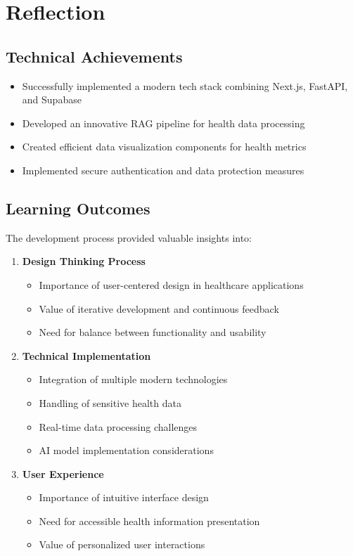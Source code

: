 \section{Reflection}
\subsection{Technical Achievements}

\begin{itemize}
    \item Successfully implemented a modern tech stack combining Next.js, FastAPI, and Supabase
    \item Developed an innovative RAG pipeline for health data processing
    \item Created efficient data visualization components for health metrics
    \item Implemented secure authentication and data protection measures
\end{itemize}

\subsection{Learning Outcomes}

The development process provided valuable insights into:

\begin{enumerate}
    \item \textbf{Design Thinking Process}
    \begin{itemize}
        \item Importance of user-centered design in healthcare applications
        \item Value of iterative development and continuous feedback
        \item Need for balance between functionality and usability
    \end{itemize}

    \item \textbf{Technical Implementation}
    \begin{itemize}
        \item Integration of multiple modern technologies
        \item Handling of sensitive health data
        \item Real-time data processing challenges
        \item AI model implementation considerations
    \end{itemize}

    \item \textbf{User Experience}
    \begin{itemize}
        \item Importance of intuitive interface design
        \item Need for accessible health information presentation
        \item Value of personalized user interactions
    \end{itemize}
\end{enumerate}

